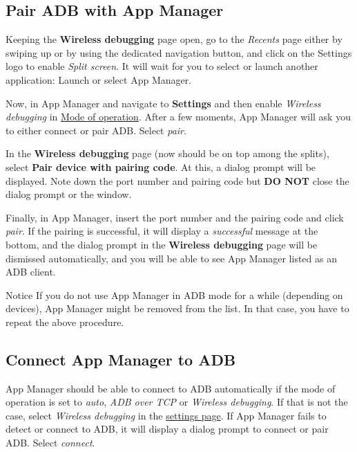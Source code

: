 \subsection{Pair ADB with App Manager}\label{subsec:pair-adb-with-app-manager} %
Keeping the \textbf{Wireless debugging} page open, go to the \textit{Recents} page either by swiping up or by using the dedicated navigation button,
and click on the Settings logo to enable \textit{Split screen}. It will wait for you to select or launch another application:
Launch or select App Manager.

Now, in App Manager and navigate to \textbf{Settings} and then enable \textit{Wireless debugging} in \hyperref[subsec:mode-of-operation]{Mode of operation}.
After a few moments, App Manager will ask you to either connect or pair ADB\@. Select \textit{pair}.

In the \textbf{Wireless debugging} page (now should be on top among the splits), select \textbf{Pair device with pairing code}.
At this, a dialog prompt will be displayed. Note down the port number and pairing code but \textbf{DO NOT} close the dialog prompt or the window.

Finally, in App Manager, insert the port number and the pairing code and click \textit{pair}. If the pairing is successful, it will display a \textit{successful} message at the bottom,
and the dialog prompt in the \textbf{Wireless debugging} page will be dismissed automatically, and you will be able to see App Manager listed as an ADB client.

\begin{tip}{Notice}
    If you do not use App Manager in ADB mode for a while (depending on devices), App Manager might be removed from the list.
    In that case, you have to repeat the above procedure.
\end{tip}

\subsection{Connect App Manager to ADB}\label{subsec:connect-app-manager-to-adb} %
App Manager should be able to connect to ADB automatically if the mode of operation is set to \textit{auto}, \textit{ADB over TCP} or \textit{Wireless debugging}.
If that is not the case, select \textit{Wireless debugging} in the \hyperref[subsec:mode-of-operation]{settings page}.
If App Manager fails to detect or connect to ADB, it will display a dialog prompt to connect or pair ADB. Select \textit{connect}.

